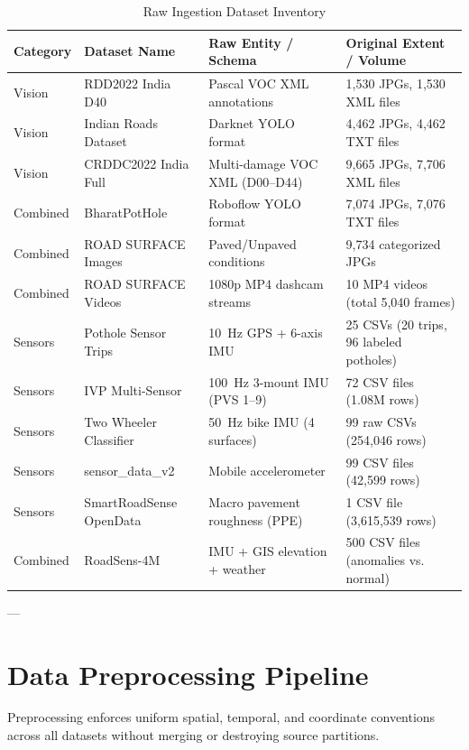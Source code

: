 \documentclass[11pt,a4paper]{article}
\begin{document}
\begin{table}[htbp]
\centering
\small
\caption{Raw Ingestion Dataset Inventory}
\label{tab:raw_inventory}
\begin{tabularx}{\textwidth}{llp{4.2cm}p{4.8cm}}
\toprule
\textbf{Category} & \textbf{Dataset Name} & \textbf{Raw Entity / Schema} & \textbf{Original Extent / Volume} \\
\midrule
Vision & RDD2022 India D40 & Pascal VOC XML annotations & 1,530 JPGs, 1,530 XML files \\
Vision & Indian Roads Dataset & Darknet YOLO format & 4,462 JPGs, 4,462 TXT files \\
Vision & CRDDC2022 India Full & Multi-damage VOC XML (D00--D44) & 9,665 JPGs, 7,706 XML files \\
Combined & BharatPotHole & Roboflow YOLO format & 7,074 JPGs, 7,076 TXT files \\
Combined & ROAD SURFACE Images & Paved/Unpaved conditions & 9,734 categorized JPGs \\
Combined & ROAD SURFACE Videos & 1080p MP4 dashcam streams & 10 MP4 videos (total 5,040 frames) \\
Sensors & Pothole Sensor Trips & 10~Hz GPS + 6-axis IMU & 25 CSVs (20 trips, 96 labeled potholes) \\
Sensors & IVP Multi-Sensor & 100~Hz 3-mount IMU (PVS 1--9) & 72 CSV files (1.08M rows) \\
Sensors & Two Wheeler Classifier & 50~Hz bike IMU (4 surfaces) & 99 raw CSVs (254,046 rows) \\
Sensors & sensor\_data\_v2 & Mobile accelerometer & 99 CSV files (42,599 rows) \\
Sensors & SmartRoadSense OpenData & Macro pavement roughness (PPE) & 1 CSV file (3,615,539 rows) \\
Combined & RoadSens-4M & IMU + GIS elevation + weather & 500 CSV files (anomalies vs. normal) \\
\bottomrule
\end{tabularx}
\end{table}

---

\section{Data Preprocessing Pipeline}

Preprocessing enforces uniform spatial, temporal, and coordinate conventions across all datasets without merging or destroying source partitions.
\end{document}
